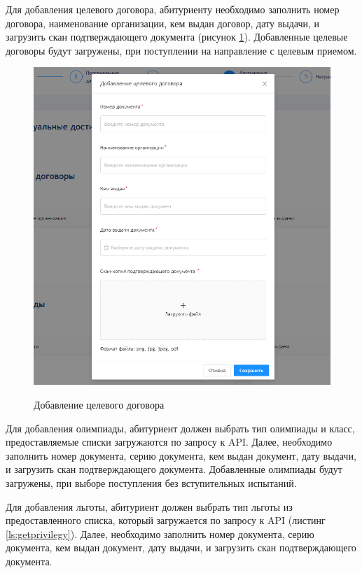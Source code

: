 Для добавления целевого договора, абитуриенту необходимо заполнить номер договора, наименование организации, кем выдан договор, дату выдачи, и загрузить скан подтверждающего документа (рисунок \ref{fig:dogovor}). Добавленные целевые договоры будут загружены, при поступлении на направление с целевым приемом.

\begin{figure}[H]
\begin{center}
\includegraphics[width=0.9\hsize]{fig/dogovor.png}\\[2mm]
\caption{Добавление целевого договора}\label{fig:dogovor}
\end{center}
\end{figure}

Для добавления олимпиады, абитуриент должен выбрать тип олимпиады и класс, предоставляемые списки загружаются по запросу к API. Далее, необходимо заполнить номер документа, серию документа, кем выдан документ, дату выдачи, и загрузить скан подтверждающего документа. Добавленные олимпиады будут загружены, при выборе поступления без вступительных испытаний.

Для добавления льготы, абитуриент должен выбрать тип льготы из предоставленного списка, который загружается по запросу к API (листинг \ref{ls:getprivilegy}). Далее, необходимо заполнить номер документа, серию документа, кем выдан документ, дату выдачи, и загрузить скан подтверждающего документа.

